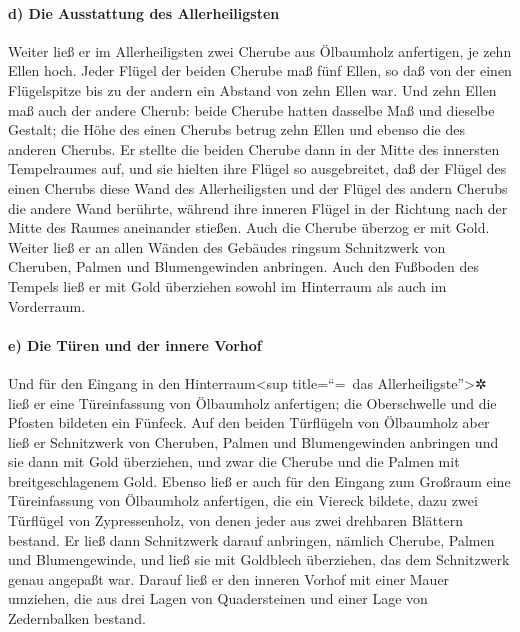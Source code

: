 \hypertarget{d-die-ausstattung-des-allerheiligsten}{%
\paragraph{d) Die Ausstattung des
Allerheiligsten}\label{d-die-ausstattung-des-allerheiligsten}}

Weiter ließ er im Allerheiligsten zwei Cherube aus
Ölbaumholz anfertigen, je zehn Ellen hoch. Jeder Flügel
der beiden Cherube maß fünf Ellen, so daß von der einen Flügelspitze bis
zu der andern ein Abstand von zehn Ellen war. Und zehn
Ellen maß auch der andere Cherub: beide Cherube hatten dasselbe Maß und
dieselbe Gestalt; die Höhe des einen Cherubs betrug zehn
Ellen und ebenso die des anderen Cherubs. Er stellte die
beiden Cherube dann in der Mitte des innersten Tempelraumes auf, und sie
hielten ihre Flügel so ausgebreitet, daß der Flügel des einen Cherubs
diese Wand des Allerheiligsten und der Flügel des andern Cherubs die
andere Wand berührte, während ihre inneren Flügel in der Richtung nach
der Mitte des Raumes aneinander stießen. Auch die Cherube
überzog er mit Gold. Weiter ließ er an allen Wänden des
Gebäudes ringsum Schnitzwerk von Cheruben, Palmen und Blumengewinden
anbringen. Auch den Fußboden des Tempels ließ er mit Gold
überziehen sowohl im Hinterraum als auch im Vorderraum.

\hypertarget{e-die-tuxfcren-und-der-innere-vorhof}{%
\paragraph{e) Die Türen und der innere
Vorhof}\label{e-die-tuxfcren-und-der-innere-vorhof}}

Und für den Eingang in den Hinterraum\textless sup
title=``=~das Allerheiligste''\textgreater✲ ließ er eine Türeinfassung
von Ölbaumholz anfertigen; die Oberschwelle und die Pfosten bildeten ein
Fünfeck. Auf den beiden Türflügeln von Ölbaumholz aber
ließ er Schnitzwerk von Cheruben, Palmen und Blumengewinden anbringen
und sie dann mit Gold überziehen, und zwar die Cherube und die Palmen
mit breitgeschlagenem Gold. Ebenso ließ er auch für den
Eingang zum Großraum eine Türeinfassung von Ölbaumholz anfertigen, die
ein Viereck bildete, dazu zwei Türflügel von
Zypressenholz, von denen jeder aus zwei drehbaren Blättern bestand.
Er ließ dann Schnitzwerk darauf anbringen, nämlich
Cherube, Palmen und Blumengewinde, und ließ sie mit Goldblech
überziehen, das dem Schnitzwerk genau angepaßt war.
Darauf ließ er den inneren Vorhof mit einer Mauer
umziehen, die aus drei Lagen von Quadersteinen und einer Lage von
Zedernbalken bestand.

